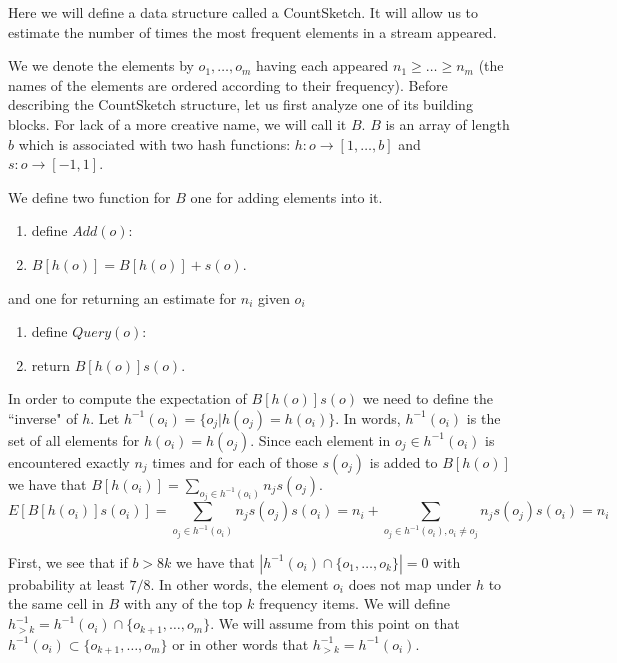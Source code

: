 \documentclass{article}
\begin{document}


Here we will define a data structure called a CountSketch. 
It will allow us to estimate the number of times the most frequent elements in a stream appeared.

We we denote the elements by $o_1,\ldots,o_m$ having each appeared $n_1 \ge \ldots \ge n_m$
(the names of the elements are ordered according to their frequency).
Before describing the CountSketch structure, let us first analyze one of its building blocks.
For lack of a more creative name, we will call it $B$.
$B$ is an array of length $b$ which is associated with two hash functions:
$h: o \rightarrow [1,\ldots,b]$ and $s: o \rightarrow [-1,1]$.
  
We define two function for $B$ one for adding elements into it.
\begin{enumerate}
\item define $Add(o)$:
\item \tab $B[h(o)] = B[h(o)] + s(o)$. 
\end{enumerate} 
and one for returning an estimate for $n_i$ given $o_i$
\begin{enumerate}
\item define $Query(o)$:
\item \tab return $B[h(o)]s(o)$. 
\end{enumerate} 

In order to compute the expectation of $B[h(o)]s(o)$ we need to define the ``inverse" of $h$. 
Let $h^{-1}(o_i) = \{o_j | h(o_j) = h(o_i)\}$. In words, $h^{-1}(o_i)$ is the set of all elements for $h(o_i)=h(o_j)$.
Since each element in $o_j \in h^{-1}(o_i)$ is encountered exactly $n_j$ times and for each of those $s(o_j)$ is added to $B[h(o)]$
we have that $B[h(o_i)] = \sum_{o_j \in h^{-1}(o_i)} n_j s(o_j)$.
$$
E[B[h(o_i)]s(o_i)] = \sum_{o_j \in h^{-1}(o_i)} n_j s(o_j)s(o_i) = n_i + \sum_{o_j \in h^{-1}(o_i),o_i \ne o_j} n_j s(o_j)s(o_i) = n_i
$$

First, we see that if $b > 8k$ we have that $|h^{-1}(o_i)\cap\{o_1,\ldots,o_k\} |=0$ with probability at least $7/8$.
In other words, the element $o_i$ does not map under $h$ to the same cell in $B$ with any of the top $k$ frequency items.
We will define $h^{-1}_{>k} = h^{-1}(o_i)\cap\{o_{k+1},\ldots,o_m\}$.
We will assume from this point on that $h^{-1}(o_i) \subset \{o_{k+1},\ldots,o_m\}$ or in other words that $h^{-1}_{>k} = h^{-1}(o_i)$.
\end{document}
